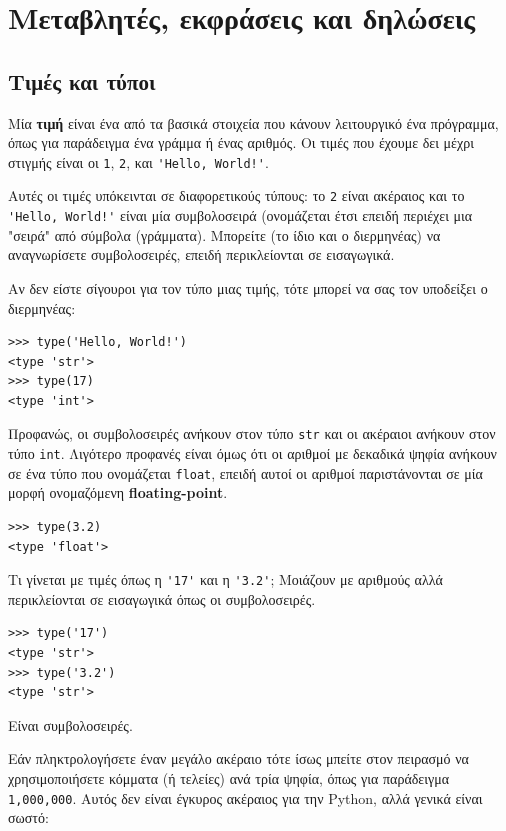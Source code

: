 \documentclass[10pt]{book}
\begin{document}
\chapter{Μεταβλητές, εκφράσεις και δηλώσεις}

\section{Τιμές και τύποι}

Μία {\bf τιμή} είναι ένα από τα βασικά στοιχεία που κάνουν λειτουργικό 
ένα πρόγραμμα, όπως για παράδειγμα ένα γράμμα ή ένας αριθμός.  Οι τιμές που έχουμε δει μέχρι στιγμής είναι οι {\tt 1}, {\tt 2}, και \verb"'Hello, World!'".

Αυτές οι τιμές υπόκεινται σε διαφορετικούς τύπους:
το {\tt 2} είναι ακέραιος και το \verb"'Hello, World!'" είναι
μία συμβολοσειρά (ονομάζεται έτσι επειδή περιέχει μια "σειρά" από
σύμβολα (γράμματα). Μπορείτε (το ίδιο και ο διερμηνέας) να αναγνωρίσετε συμβολοσειρές, επειδή περικλείονται σε εισαγωγικά.

Αν δεν είστε σίγουροι για τον τύπο μιας τιμής, τότε μπορεί να σας τον υποδείξει ο  διερμηνέας:

\begin{verbatim}
>>> type('Hello, World!')
<type 'str'>
>>> type(17)
<type 'int'>
\end{verbatim}
%

Προφανώς, οι συμβολοσειρές ανήκουν στον τύπο {\tt str}
και οι ακέραιοι ανήκουν στον τύπο {\tt int}.  
Λιγότερο προφανές είναι όμως ότι οι αριθμοί με δεκαδικά ψηφία ανήκουν
σε ένα τύπο που ονομάζεται {\tt float}, επειδή αυτοί οι αριθμοί
παριστάνονται σε μία μορφή ονομαζόμενη  {\bf floating-point}.

\begin{verbatim}
>>> type(3.2)
<type 'float'>
\end{verbatim}
%
Τι γίνεται με τιμές όπως η \verb"'17'" και η 
\verb"'3.2'"; Μοιάζουν με αριθμούς αλλά περικλείονται
σε εισαγωγικά όπως οι συμβολοσειρές.

\begin{verbatim}
>>> type('17')
<type 'str'>
>>> type('3.2')
<type 'str'>
\end{verbatim}
%

Είναι συμβολοσειρές.

Εάν πληκτρολογήσετε έναν μεγάλο ακέραιο τότε ίσως μπείτε στον πειρασμό
να χρησιμοποιήσετε κόμματα (ή τελείες) ανά τρία ψηφία, όπως για παράδειγμα
{\tt 1,000,000}.  Αυτός δεν είναι έγκυρος ακέραιος για την 
Python, αλλά γενικά είναι σωστό:
\end{document}
